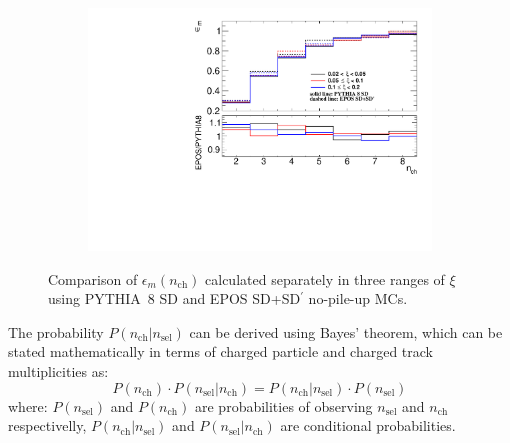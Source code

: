 \begin{figure}[h!]
	\centering
	\begin{subfigure}{.47\textwidth}
		\includegraphics[width=\textwidth,page=1]{chapters/chrgSTAR/img/unfolding/nch_m2_nsel_s2.pdf}
	\end{subfigure}
	\begin{minipage}{.48\textwidth}
		\caption{Comparison of $\epsilon_{m}(n_\textrm{ch})$  calculated separately in three ranges of $\xi$ using PYTHIA~8 SD and EPOS SD+SD$^\prime$ no-pile-up MCs.}
		\label{fig:correctionSTAR_syst}
	\end{minipage}
	
\end{figure}

\noindent The  probability $P(n_\textrm{ch}|n_\textrm{sel})$ can be derived using Bayes' theorem, which can be stated mathematically in terms of charged particle and charged track multiplicities as:
\begin{equation}
P\left(n_\textrm{ch}\right)\cdot P\left(n_\textrm{sel}|n_\textrm{ch}\right) = P\left(n_\textrm{ch}|n_\textrm{sel}\right)\cdot P\left(n_\textrm{sel}\right)
\end{equation}
where: $P(n_\textrm{sel})$ and $P(n_\textrm{ch})$ are probabilities of observing $n_\textrm{sel}$ and $n_\textrm{ch}$ respectivelly, $P(n_\textrm{ch}|n_\textrm{sel})$ and $P(n_\textrm{sel}|n_\textrm{ch})$ are conditional probabilities.
 
